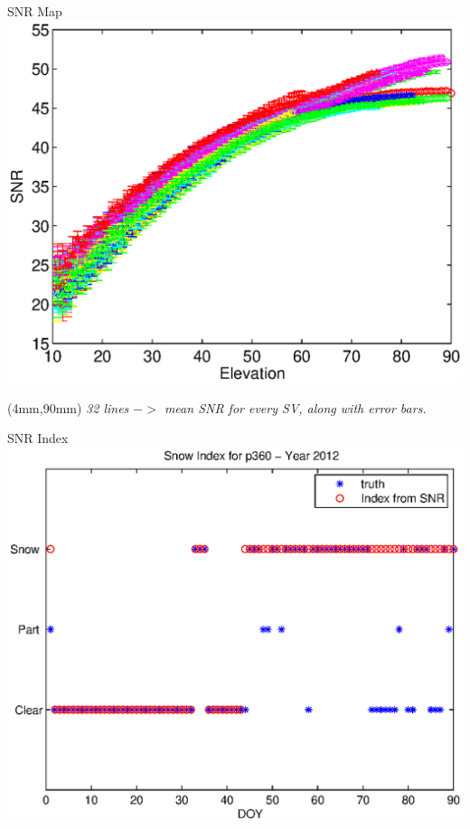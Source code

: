 \documentclass{beamer}
\newenvironment{reference}[2]{%
  \begin{textblock*}{\textwidth}(#1,#2) 
      \footnotesize\it\bgroup\color{red!50!black}}{\egroup\end{textblock*}}
\begin{document}
\begin{frame}{SNR Map}
  \includegraphics[width=1\linewidth,clip=true]{snrMap.eps}
  \begin{reference}{4mm}{90mm}
    32 lines $->$ mean SNR for every SV, along with error bars.
  \end{reference}
\end{frame}

\begin{frame}{SNR Index}
  \includegraphics[width=1\linewidth,clip=true]{snrIndex.eps}
\end{frame}
\end{document}
